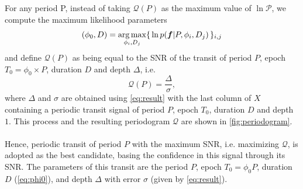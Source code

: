 \documentclass[modern]{aastex631}
\begin{document}
For any period P, instead of taking $ \mathcal{Q}(P)$ as the maximum value of $\ln\mathcal{P}$, we compute the maximum likelihood parameters
\begin{equation}\label{eq:phi0}
    (\phi_0 ,D) = \argmax_{\phi_i, D_j} \set{\ln p(\bm{f} \vert P, \phi_i, D_j)}_{i, j}
\end{equation}
and define $\mathcal{Q}(P)$ as being equal to the SNR of the transit of period $P$, epoch $T_0 = \phi_0 \times P$, duration $D$ and depth $\Delta$, i.e.
\begin{equation*}
    \mathcal{Q}(P) = \frac{\Delta}{\sigma},
\end{equation*}
where $\Delta$ and $\sigma$ are obtained using \autoref{eq:result} with the last column of $X$ containing a periodic transit signal of period $P$, epoch $T_0$, duration $D$ and depth $1$. This process and the resulting periodogram $\mathcal{Q}$ are shown in \autoref{fig:periodogram}.\\\\
Hence, periodic transit of period $P$ with the maximum SNR, i.e. maximizing $\mathcal{Q}$, is adopted as the best candidate, basing the confidence in this signal through its SNR. The parameters of this transit are the period $P$, epoch $T_0 = \phi_0 P$, duration $D$ (\autoref{eq:phi0}), and depth $\Delta$ with error $\sigma$ (given by \autoref{eq:result}).\\\\
\end{document}
